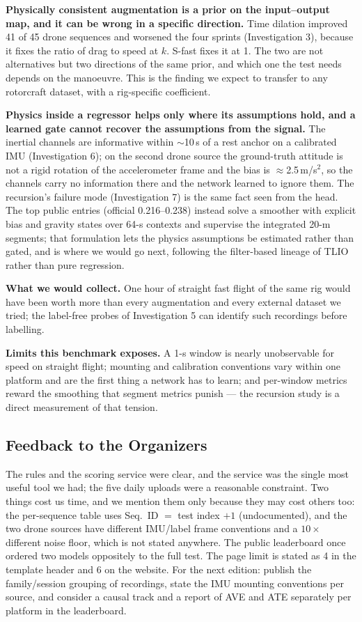 \documentclass[letterpaper,10pt,conference]{ieeeconf}
\begin{document}
\textbf{Physically consistent augmentation is a prior on the input--output map, and it can be
wrong in a specific direction.} Time dilation improved 41 of 45 drone sequences and worsened
the four sprints (Investigation 3), because it fixes the ratio of drag to speed at $k$. S-fast
fixes it at 1. The two are not alternatives but two directions of the same prior, and which one
the test needs depends on the manoeuvre. This is the finding we expect to transfer to any rotorcraft
dataset, with a rig-specific coefficient.

\textbf{Physics inside a regressor helps only where its assumptions hold, and a learned gate
cannot recover the assumptions from the signal.} The inertial channels are informative within
$\sim$10\,s of a rest anchor on a calibrated IMU (Investigation 6); on the second drone source the
ground-truth attitude is not a rigid rotation of the accelerometer frame and the bias is
$\approx$2.5\,m/s$^2$, so the channels carry no information there and the network learned to
ignore them. The recursion's failure mode (Investigation 7) is the same fact seen from the head.
The top public entries (official 0.216--0.238) instead solve a smoother with explicit bias and
gravity states over 64-s contexts and supervise the integrated 20-m segments; that formulation
lets the physics assumptions be estimated rather than gated, and is where we would go next,
following the filter-based lineage of TLIO~\cite{tlio} rather than pure regression.

\textbf{What we would collect.} One hour of straight fast flight of the same rig would have been
worth more than every augmentation and every external dataset we tried; the label-free probes of
Investigation 5 can identify such recordings before labelling.

\textbf{Limits this benchmark exposes.} A 1-s window is nearly unobservable for speed on straight
flight; mounting and calibration conventions vary within one platform and are the first thing a
network has to learn; and per-window metrics reward the smoothing that segment metrics punish
--- the recursion study is a direct measurement of that tension.

\subsection{Feedback to the Organizers}
The rules and the scoring service were clear, and the service was the single most useful tool we
had; the five daily uploads were a reasonable constraint. Two things cost us time, and we mention
them only because they may cost others too: the per-sequence table uses
Seq.\ ID $=$ test index $+1$ (undocumented), and the two drone sources have different IMU/label
frame conventions and a $10\times$ different noise floor, which is not stated anywhere. The public
leaderboard once ordered two models oppositely to the full test. The page limit is stated as
4 in the template header and 6 on the website. For the next edition: publish the family/session
grouping of recordings, state the IMU mounting conventions per source, and consider a causal track
and a report of AVE and ATE separately per platform in the leaderboard.
\end{document}

